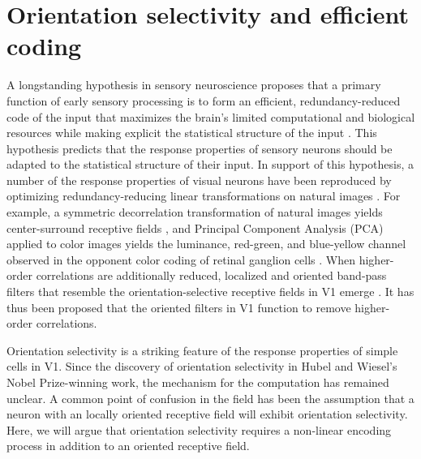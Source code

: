 

\section{Orientation selectivity and efficient coding}
A longstanding hypothesis in sensory neuroscience proposes that a primary function of early sensory processing is to form an efficient, redundancy-reduced code of the input that maximizes the brain's limited computational and biological resources while making explicit the statistical structure of the input \parencite{barlow2001redundancy}. This hypothesis predicts that the response properties of sensory neurons should be adapted to the statistical structure of their input. In support of this hypothesis, a number of the response properties of visual neurons have been reproduced by optimizing redundancy-reducing linear transformations on natural images \parencite{atick1990towards}. For example, a symmetric decorrelation transformation of natural images yields center-surround receptive fields \parencite{atick1990towards}, and Principal Component Analysis (PCA) applied to color images yields the luminance, red-green, and blue-yellow channel observed in the opponent color coding of retinal ganglion cells \parencite{ruderman1998statistics, buchsbaum1983trichromacy}. When higher-order correlations are additionally reduced, localized and oriented band-pass filters that resemble the orientation-selective receptive fields in V1 emerge \parencite{bell1997independent, olshausen1999probabilistic}. It has thus been proposed that the oriented filters in V1 function to remove higher-order correlations.

Orientation selectivity is a striking feature of the response properties of simple cells in V1. Since the discovery of orientation selectivity in Hubel and Wiesel's Nobel Prize-winning work, the mechanism for the computation has remained unclear. A common point of confusion in the field has been the assumption that a neuron with an locally oriented receptive field will exhibit orientation selectivity. Here, we will argue that orientation selectivity requires a non-linear encoding process in addition to an oriented receptive field.

